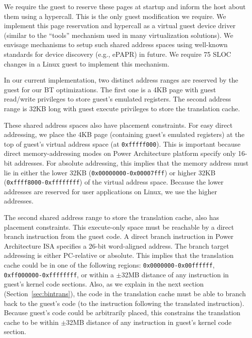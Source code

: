 \documentclass[10pt,twocolumn]{article}
\begin{document}
We require the guest to reserve these pages at startup and inform the host about
them using a hypercall.
This is the only guest modification we require.
We implement this page reservation
and hypercall as a virtual guest device driver (similar to the ``tools'' mechanism
used in many virtualization solutions). We envisage mechanisms to setup
such shared address spaces using well-known standards for device
discovery (e.g., ePAPR\cite{ePAPR}) in future.
We require 75 SLOC changes in a Linux guest to implement this mechanism.

In our current implementation, two distinct address ranges are reserved by the
guest for our BT optimizations.
The first one is a 4KB page with guest read/write privileges
to store guest's emulated registers.  The second address range is 32KB long
with guest execute privileges to store the translation cache.

These shared address spaces also have placement constraints. For easy direct
addressing, we place the 4KB page (containing guest's emulated registers) at
the top of guest's virtual address space (at {\tt 0xfffff000}). This is important 
because direct memory-addressing modes on Power Architecture platform specify only 16-bit
addresses. For absolute addressing, this implies that the memory
address must lie in either
the lower 32KB ({\tt 0x00000000-0x00007fff}) or higher
32KB ({\tt 0xffff8000-0xffffffff}) of the virtual address space. Because the lower
addresses are reserved for user applications on Linux, we use the higher addresses.

The second shared address range to store the translation cache, also has placement
constraints. This execute-only space must be reachable
by a direct branch instruction from the guest code. A direct branch instruction
in Power Architecture ISA specifies a 26-bit
word-aligned address. The branch target addressing is either PC-relative
or absolute. This implies that the translation cache could be
in one of the following regions: {\tt 0x0000000-0x00ffffff}, {\tt 0xff000000-0xffffffff},
or within a $\pm$32MB distance of any instruction in guest's kernel code sections.
Also, as we explain in the
next section (Section~\ref{sec:bintrans}), the code in the translation cache must
be able to branch
back to the guest's code (to the instruction following the translated instruction).
Because guest's code could be arbitrarily placed, this constrains the translation
cache to be within $\pm$32MB distance of any instruction in
guest's kernel code section.
\end{document}
